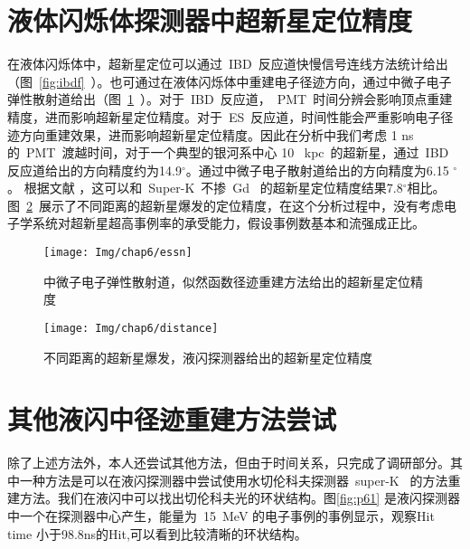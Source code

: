 \section{液体闪烁体探测器中超新星定位精度}
在液体闪烁体中，超新星定位可以通过~IBD~反应道快慢信号连线方法统计给出（图~\ref{fig:ibdf}~）。也可通过在液体闪烁体中重建电子径迹方向，通过中微子电子弹性散射道给出（图~\ref{fig:esnu}~）。对于~IBD~反应道，~PMT~时间分辨会影响顶点重建精度，进而影响超新星定位精度。对于~ES~反应道，时间性能会严重影响电子径迹方向重建效果，进而影响超新星定位精度。因此在分析中我们考虑 1 ns的~PMT~渡越时间，对于一个典型的银河系中心 10 ~kpc~的超新星，通过~IBD~ 反应道给出的方向精度约为14.9$^{\circ}$。通过中微子电子散射道给出的方向精度为6.15 $^{\circ}$。 根据文献 \citep{tomas2003supernova}，这可以和~Super-K~不掺~Gd~ 的超新星定位精度结果7.8$^{\circ}$相比。图~\ref{fig:distance}~展示了不同距离的超新星爆发的定位精度，在这个分析过程中，没有考虑电子学系统对超新星超高事例率的承受能力，假设事例数基本和流强成正比。
\begin{figure}[!htbp]
  \centering
   \texttt{[image: Img/chap6/essn]}
    \caption{中微子电子弹性散射道，似然函数径迹重建方法给出的超新星定位精度}
  \label{fig:esnu}
\end{figure}
\begin{figure}[!htbp]
  \centering
   \texttt{[image: Img/chap6/distance]}
    \caption{不同距离的超新星爆发，液闪探测器给出的超新星定位精度}
  \label{fig:distance}
\end{figure}
\section{其他液闪中径迹重建方法尝试}
除了上述方法外，本人还尝试其他方法，但由于时间关系，只完成了调研部分。其中一种方法是可以在液闪探测器中尝试使用水切伦科夫探测器~super-K~ 的方法重建方法。我们在液闪中可以找出切伦科夫光的环状结构。图\ref{fig:p61} 是液闪探测器中一个在探测器中心产生，能量为~15~MeV 的电子事例的事例显示，观察Hit time 小于98.8ns的Hit,可以看到比较清晰的环状结构。%


